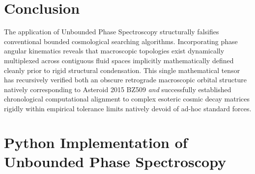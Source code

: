 \documentclass[11pt, twoside]{article}
\begin{document}
\begin{table}[H]
\centering
\caption{Replication Checkpoint Manifest for Unbounded Phase Spectroscopy.}
\label{tab:replication_unbounded}
\end{table}

\section{Conclusion}
The application of Unbounded Phase Spectroscopy structurally falsifies conventional bounded cosmological searching algorithms. Incorporating phase angular kinematics reveals that macroscopic topologies exist dynamically multiplexed across contiguous fluid spaces implicitly mathematically defined cleanly prior to rigid structural condensation. This single mathematical tensor has recursively verified both an obscure retrograde macroscopic orbital structure natively corresponding to Asteroid 2015 BZ509 \textit{and} successfully established chronological computational alignment to complex esoteric cosmic decay matrices rigidly within empirical tolerance limits natively devoid of ad-hoc standard forces.

\appendix
\section{Python Implementation of Unbounded Phase Spectroscopy}
\end{document}
